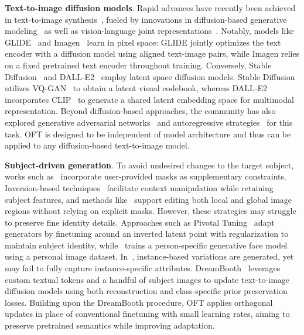 \textbf{Text-to-image diffusion models}. Rapid advances have recently been achieved in text-to-image synthesis~\cite{saharia2022photorealistic,ramesh2022hierarchical,rombach2022high,gu2022vector,nichol2022glide}, fueled by innovations in diffusion-based generative modeling~\cite{ho2020denoising,song2021score,song2021denoising,dhariwal2021diffusion} as well as vision-language joint representations~\cite{su2020vlbert,lu2019vilbert,radford2021learning,wang2021simvlm,li2022blip,li2023blip,alayrac2022flamingo,schuhmann2022laion}. Notably, models like GLIDE~\cite{nichol2022glide} and Imagen~\cite{saharia2022photorealistic} learn in pixel space: GLIDE jointly optimizes the text encoder with a diffusion model using aligned text-image pairs, while Imagen relies on a fixed pretrained text encoder throughout training. Conversely, Stable Diffusion~\cite{rombach2022high} and DALL-E2~\cite{ramesh2022hierarchical} employ latent space diffusion models. Stable Diffusion utilizes VQ-GAN~\cite{esser2021taming} to obtain a latent visual codebook, whereas DALL-E2 incorporates CLIP~\cite{radford2021learning} to generate a shared latent embedding space for multimodal representation. Beyond diffusion-based approaches, the community has also explored generative adversarial networks~\cite{reed2016generative,zhang2017stackgan,xu2018attngan,li2019controllable} and autoregressive strategies~\cite{ramesh2021zero,ding2021cogview,wu2022nuwa,yuscaling} for this task. OFT is designed to be independent of model architecture and thus can be applied to any diffusion-based text-to-image model.

\textbf{Subject-driven generation}. To avoid undesired changes to the target subject, works such as~\cite{avrahami2022blended,nichol2022glide} incorporate user-provided masks as supplementary constraints. Inversion-based techniques~\cite{choi2021ilvr,dhariwal2021diffusion,ramesh2022hierarchical,gal2022image} facilitate context manipulation while retaining subject features, and methods like~\cite{hertz2022prompt} support editing both local and global image regions without relying on explicit masks. However, these strategies may struggle to preserve fine identity details. Approaches such as Pivotal Tuning~\cite{roich2022pivotal} adapt generators by finetuning around an inverted latent point with regularization to maintain subject identity, while~\cite{nitzan2022mystyle} trains a person-specific generative face model using a personal image dataset. In~\cite{casanova2021instance}, instance-based variations are generated, yet may fail to fully capture instance-specific attributes. DreamBooth~\cite{ruiz2023dreambooth} leverages custom textual tokens and a handful of subject images to update text-to-image diffusion models using both reconstruction and class-specific prior preservation losses. Building upon the DreamBooth procedure, OFT applies orthogonal updates in place of conventional finetuning with small learning rates, aiming to preserve pretrained semantics while improving adaptation.

